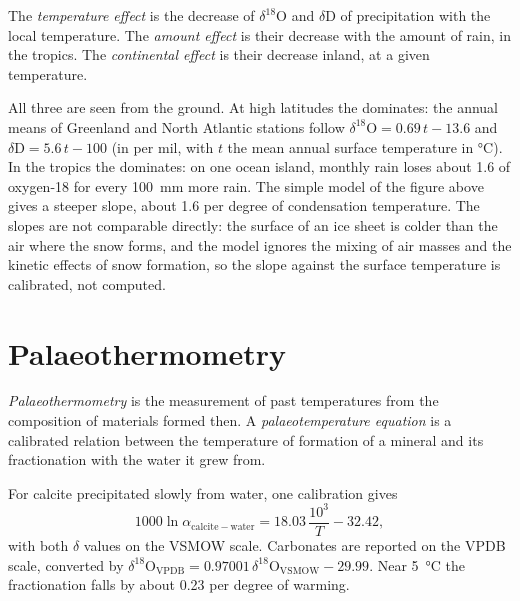\begin{definition}\label{def:b3:stable-isotopes:effects}
The \emph{temperature effect} is the
decrease of $\delta^{18}\mathrm O$ and $\delta\mathrm D$ of precipitation with the
local temperature. The \emph{amount effect} is their
decrease with the amount of rain, in the tropics. The \emph{continental
effect} is their decrease inland, at a given
temperature.
\end{definition}

All three are  seen from the ground. At high latitudes
the  dominates: the annual means of Greenland and North
Atlantic stations follow $\delta^{18}\mathrm O = 0.69\,t - 13.6$ and $\delta\mathrm D =
5.6\,t - 100$ (in per mil, with $t$ the mean annual surface temperature in
\unit{\celsius}). In the tropics the  dominates: on one ocean
island, monthly rain loses about \qty{1.6}{\permil} of oxygen-18 for every
\qty{100}{mm} more rain. The simple model of the figure above gives a steeper
slope, about \qty{1.6}{\permil} per degree of condensation temperature. The
slopes are not comparable directly: the surface of an ice sheet is colder
than the air where the snow forms, and the model ignores the mixing of air
masses and the kinetic effects of snow formation, so the slope against the
surface temperature is calibrated, not computed.

\section{Palaeothermometry}\label{sec:b3:stable-isotopes:palaeothermometry}

\begin{definition}
\label{def:b3:stable-isotopes:palaeothermometry}
\emph{Palaeothermometry} is the measurement of past
temperatures from the composition of materials formed then. A
\emph{palaeotemperature equation} is a
calibrated relation between the temperature of formation of a mineral and its
fractionation with the water it grew from.
\end{definition}

For calcite precipitated slowly from water, one calibration gives
\[
1000\ln\alpha_{\mathrm{calcite-water}} = 18.03\,\frac{10^3}{T} - 32.42,
\]
with both $\delta$ values on the VSMOW scale. Carbonates are reported on the
VPDB scale, converted by $\delta^{18}\mathrm O_{\mathrm{VPDB}} =
0.97001\,\delta^{18}\mathrm O_{\mathrm{VSMOW}} - 29.99$. Near \qty{5}{\celsius} the
fractionation falls by about \qty{0.23}{\permil} per degree of warming.

